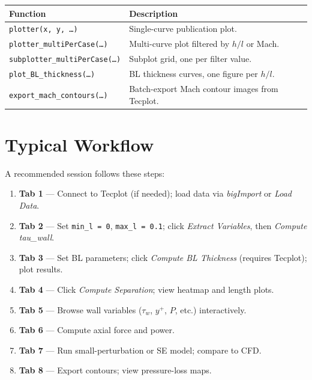 \documentclass[11pt,letterpaper]{article}
\begin{document}
\begin{table}[h]
\centering
\small
\begin{tabular}{lp{8cm}}
\toprule
\textbf{Function} & \textbf{Description} \\
\midrule
\texttt{plotter(x, y, \ldots)} &
  Single-curve publication plot.\\
\texttt{plotter\_multiPerCase(\ldots)} &
  Multi-curve plot filtered by $h/l$ or Mach.\\
\texttt{subplotter\_multiPerCase(\ldots)} &
  Subplot grid, one per filter value.\\
\texttt{plot\_BL\_thickness(\ldots)} &
  BL thickness curves, one figure per $h/l$.\\
\texttt{export\_mach\_contours(\ldots)} &
  Batch-export Mach contour images from Tecplot.\\
\bottomrule
\end{tabular}
\end{table}

\section{Typical Workflow}

A recommended session follows these steps:

\begin{enumerate}
  \item \textbf{Tab 1} — Connect to Tecplot (if needed); load data via
        \emph{bigImport} or \emph{Load Data}.
  \item \textbf{Tab 2} — Set \texttt{min\_l = 0}, \texttt{max\_l = 0.1};
        click \emph{Extract Variables}, then \emph{Compute tau\_wall}.
  \item \textbf{Tab 3} — Set BL parameters; click \emph{Compute BL Thickness}
        (requires Tecplot); plot results.
  \item \textbf{Tab 4} — Click \emph{Compute Separation}; view heatmap and
        length plots.
  \item \textbf{Tab 5} — Browse wall variables ($\tau_w$, $y^+$, $P$, etc.)
        interactively.
  \item \textbf{Tab 6} — Compute axial force and power.
  \item \textbf{Tab 7} — Run small-perturbation or SE model; compare to CFD.
  \item \textbf{Tab 8} — Export contours; view pressure-loss maps.
\end{enumerate}
\end{document}
